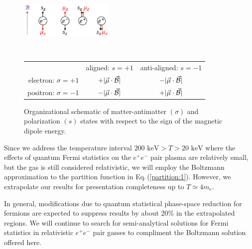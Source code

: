 \documentclass[aps,prd,floatfix,reprint]{revtex4-2}
\newcommand*{\keV}{\text{ keV}}
\newcommand{\req}[1]{Eq.\,(\ref{#1})}
\newcommand\Tstrut{\rule{0pt}{2.6ex}}       %
\newcommand\Bstrut{\rule[-0.9ex]{0pt}{0pt}} %
\newcommand{\TBstrut}{\Tstrut\Bstrut} %
\begin{document}
\begin{figure}[ht]
    \centering
    \includegraphics[width=0.4\textwidth]{plots/schematic.png}\Bstrut\\
    \begin{tabular}{ r|c|c| }
    \multicolumn{1}{r}{}
     &  \multicolumn{1}{c}{aligned: $s=+1$}
     & \multicolumn{1}{c}{anti-aligned: $s=-1$} \\
    \cline{2-3}
    electron: $\sigma=+1$ & $+|\vec{\mu}\cdot\vec{\cal B}|$ & $-|\vec{\mu}\cdot\vec{\cal B}|$ \TBstrut\\
    \cline{2-3}
    positron: $\sigma=-1$ & $-|\vec{\mu}\cdot\vec{\cal B}|$ & $+|\vec{\mu}\cdot\vec{\cal B}|$ \TBstrut\\
    \cline{2-3}
    \end{tabular}
        \caption{Organizational schematic of matter-antimatter $(\sigma)$ and polarization $(s)$ states with respect to the sign of the magnetic dipole energy.}
    \label{tab:1}
\end{figure}

Since we address the temperature interval $200\keV>T>20\keV$ where the effects of quantum Fermi statistics on the $e^{+}e^{-}$ pair plasma are relatively small, but the gas is still considered relativistic, we will employ the Boltzmann approximation to the partition function in \req{partition:1}. However, we extrapolate our results for presentation completeness up to $T\simeq 4m_{e}$.

In general, modifications due to quantum statistical phase-space reduction for fermions are expected to suppress results by about 20\% in the extrapolated regions. We will continue to search for semi-analytical solutions for Fermi statistics in relativistic $e^{+}e^{-}$ pair gasses to compliment the Boltzmann solution offered here. 

\end{document}
